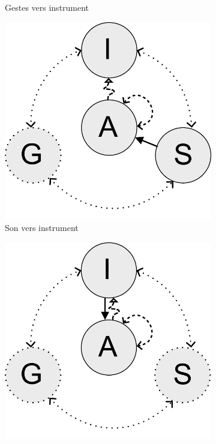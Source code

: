 \begin{figure}[!htbp]
{\begin{subfigure}[b]{.33\textwidth}
			\caption{Gestes vers instrument}
		\end{subfigure}%
		\hspace{.02\linewidth}
		\begin{subfigure}[b]{.33\textwidth}
			\centering
			\includegraphics[width=0.9\linewidth]{gfx/03_gesture/gesture-inference-h.pdf}
			\caption{Son vers instrument}
		\end{subfigure}%
		\hspace{.02\linewidth}
		\begin{subfigure}[b]{.33\textwidth}
			\centering
			\includegraphics[width=0.9\linewidth]{gfx/03_gesture/gesture-inference-i.pdf}

\end{subfigure}}
\end{figure}
